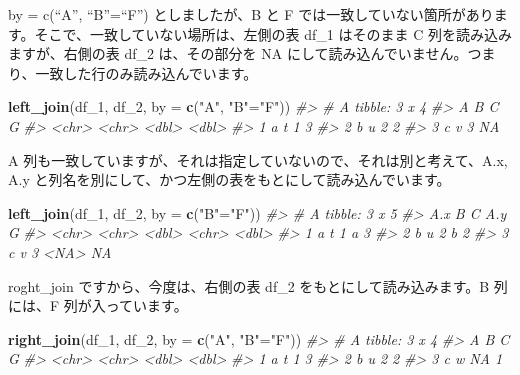 \documentclass[
  xelatex, ja=standard]{bxjsbook}
\newenvironment{Shaded}{\begin{snugshade}}{\end{snugshade}}
\newcommand{\AttributeTok}[1]{\textcolor[rgb]{0.13,0.29,0.53}{#1}}
\newcommand{\CommentTok}[1]{\textcolor[rgb]{0.56,0.35,0.01}{\textit{#1}}}
\newcommand{\FunctionTok}[1]{\textcolor[rgb]{0.13,0.29,0.53}{\textbf{#1}}}
\newcommand{\NormalTok}[1]{#1}
\newcommand{\OtherTok}[1]{\textcolor[rgb]{0.56,0.35,0.01}{#1}}
\newcommand{\StringTok}[1]{\textcolor[rgb]{0.31,0.60,0.02}{#1}}
\theoremstyle{definition}
\theoremstyle{definition}
\theoremstyle{definition}
\theoremstyle{definition}
\theoremstyle{remark}
\begin{document}
by = c(``A'', ``B''=``F'') としましたが、B と F では一致していない箇所があります。そこで、一致していない場所は、左側の表 df\_1 はそのまま C 列を読み込みますが、右側の表 df\_2 は、その部分を NA にして読み込んでいません。つまり、一致した行のみ読み込んでいます。

\begin{Shaded}
\begin{Highlighting}[]
\FunctionTok{left\_join}\NormalTok{(df\_1, df\_2, }\AttributeTok{by =} \FunctionTok{c}\NormalTok{(}\StringTok{"A"}\NormalTok{, }\StringTok{"B"}\OtherTok{=}\StringTok{"F"}\NormalTok{))}
\CommentTok{\#\textgreater{} \# A tibble: 3 x 4}
\CommentTok{\#\textgreater{}   A     B         C     G}
\CommentTok{\#\textgreater{}   \textless{}chr\textgreater{} \textless{}chr\textgreater{} \textless{}dbl\textgreater{} \textless{}dbl\textgreater{}}
\CommentTok{\#\textgreater{} 1 a     t         1     3}
\CommentTok{\#\textgreater{} 2 b     u         2     2}
\CommentTok{\#\textgreater{} 3 c     v         3    NA}
\end{Highlighting}
\end{Shaded}

A 列も一致していますが、それは指定していないので、それは別と考えて、A.x, A.y と列名を別にして、かつ左側の表をもとにして読み込んでいます。

\begin{Shaded}
\begin{Highlighting}[]
\FunctionTok{left\_join}\NormalTok{(df\_1, df\_2, }\AttributeTok{by =} \FunctionTok{c}\NormalTok{(}\StringTok{"B"}\OtherTok{=}\StringTok{"F"}\NormalTok{))}
\CommentTok{\#\textgreater{} \# A tibble: 3 x 5}
\CommentTok{\#\textgreater{}   A.x   B         C A.y       G}
\CommentTok{\#\textgreater{}   \textless{}chr\textgreater{} \textless{}chr\textgreater{} \textless{}dbl\textgreater{} \textless{}chr\textgreater{} \textless{}dbl\textgreater{}}
\CommentTok{\#\textgreater{} 1 a     t         1 a         3}
\CommentTok{\#\textgreater{} 2 b     u         2 b         2}
\CommentTok{\#\textgreater{} 3 c     v         3 \textless{}NA\textgreater{}     NA}
\end{Highlighting}
\end{Shaded}

roght\_join ですから、今度は、右側の表 df\_2 をもとにして読み込みます。B 列には、F 列が入っています。

\begin{Shaded}
\begin{Highlighting}[]
\FunctionTok{right\_join}\NormalTok{(df\_1, df\_2, }\AttributeTok{by =} \FunctionTok{c}\NormalTok{(}\StringTok{"A"}\NormalTok{, }\StringTok{"B"}\OtherTok{=}\StringTok{"F"}\NormalTok{))}
\CommentTok{\#\textgreater{} \# A tibble: 3 x 4}
\CommentTok{\#\textgreater{}   A     B         C     G}
\CommentTok{\#\textgreater{}   \textless{}chr\textgreater{} \textless{}chr\textgreater{} \textless{}dbl\textgreater{} \textless{}dbl\textgreater{}}
\CommentTok{\#\textgreater{} 1 a     t         1     3}
\CommentTok{\#\textgreater{} 2 b     u         2     2}
\CommentTok{\#\textgreater{} 3 c     w        NA     1}
\end{Highlighting}
\end{Shaded}
\end{document}
